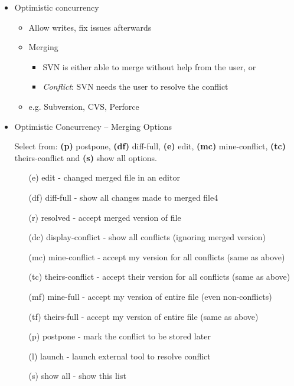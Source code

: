 \begin{itemize}
\begin{itemize}
			\item Optimistic concurrency
			\begin{itemize}
				\item Allow writes, fix issues afterwards
				\item Merging
				\begin{itemize}
					\item SVN is either able to merge without help from the user, or
					\item \textit{Conflict}: SVN needs the user to resolve the conflict
				\end{itemize}
				\item e.g. Subversion, CVS, Perforce
			\end{itemize}
			\newpage
			\item Optimistic Concurrency – Merging Options

			Select from: \textbf{(p)} postpone, \textbf{(df)} diff-full, \textbf{(e)} edit, \textbf{(mc)} mine-conflict, \textbf{(tc)} theirs-conflict and \textbf{(s)} show all options.\\[-15pt]
			\begin{center}
				\begin{minipage}[c]{0.6\textwidth}
					\begin{itemize}
						\item[(e) edit] - changed merged file in an editor
						\item[(df) diff-full] - show all changes made to merged file4
						\item[(r) resolved]  - accept merged version of file\\
						\item[(dc) display-conflict] - show all conflicts (ignoring merged version)
						\item[(mc) mine-conflict] -  accept my version for all conflicts (same as above)
						\item[(tc) theirs-conflict] -  accept their version for all conflicts (same as above) \\
						\item[(mf) mine-full] - accept my version of entire file (even non-conflicts)
						\item[(tf) theirs-full]  - accept my version of entire file (same as above)\\
						\item[(p) postpone] - mark the conflict to be stored later
						\item[(l) launch] - launch external tool to resolve conflict
						\item[(s) show all] - show this list
					\end{itemize}
				\end{minipage}
			\end{center}
		\end{itemize}


\end{itemize}
